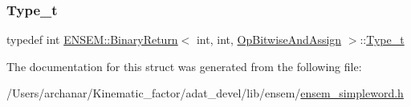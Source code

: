 \mbox{\label{structENSEM_1_1BinaryReturn_3_01int_00_01int_00_01OpBitwiseAndAssign_01_4_a0dd17e33f27d41964bcaa781f8d58aca}} 
\subsubsection{\texorpdfstring{Type\_t}{Type\_t}\hspace{0.1cm}{\footnotesize\ttfamily [2/2]}}
{\footnotesize\ttfamily typedef int \mbox{\hyperlink{structENSEM_1_1BinaryReturn}{E\+N\+S\+E\+M\+::\+Binary\+Return}}$<$ int, int, \mbox{\hyperlink{structENSEM_1_1OpBitwiseAndAssign}{Op\+Bitwise\+And\+Assign}} $>$\+::\mbox{\hyperlink{structENSEM_1_1BinaryReturn_3_01int_00_01int_00_01OpBitwiseAndAssign_01_4_a0dd17e33f27d41964bcaa781f8d58aca}{Type\+\_\+t}}}



The documentation for this struct was generated from the following file\+:\begin{DoxyCompactItemize}
\item 
/\+Users/archanar/\+Kinematic\+\_\+factor/adat\+\_\+devel/lib/ensem/\mbox{\hyperlink{lib_2ensem_2ensem__simpleword_8h}{ensem\+\_\+simpleword.\+h}}\end{DoxyCompactItemize}
